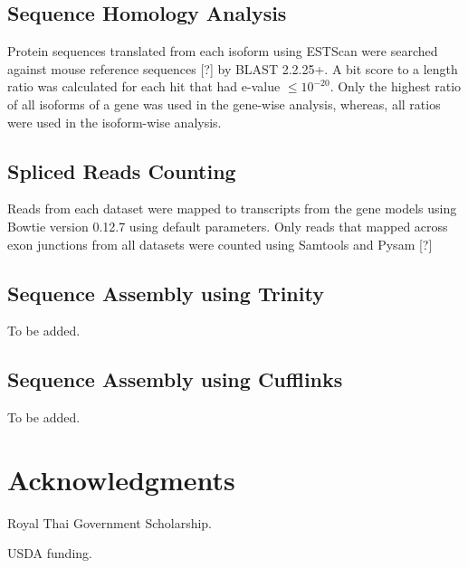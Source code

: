 \documentclass[10pt]{article}
\begin{document}
\subsection*{Sequence Homology Analysis}

Protein sequences translated from each isoform using ESTScan were searched against mouse reference sequences [?] by BLAST 2.2.25+\cite{Tatusova:1999tz}.
A bit score to a length ratio was calculated for each hit that had e-value $\le 10^{-20}$.
Only the highest ratio of all isoforms of a gene was used in the gene-wise analysis, whereas, all ratios were used in the isoform-wise analysis.

\subsection*{Spliced Reads Counting}

Reads from each dataset were mapped to transcripts from the gene models using Bowtie version 0.12.7 using default parameters.
Only reads that mapped across exon junctions from all datasets were counted using Samtools\cite{Li:2009vz} and Pysam [?]

\subsection*{Sequence Assembly using Trinity}
To be added.

\subsection*{Sequence Assembly using Cufflinks}
To be added.

\section*{Acknowledgments}

Royal Thai Government Scholarship.

{\noindent}USDA funding.


\end{document}
